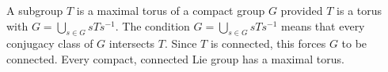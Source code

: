 A subgroup $T$ is a maximal torus of a compact group $G$ provided $T$ is a torus with $G = \bigcup_{s \in G} sTs^{-1}$. The condition $G = \bigcup_{s \in G} sTs^{-1}$ means that every conjugacy class of $G$ intersects $T$. Since $T$ is connected, this forces $G$ to be connected. Every compact, connected Lie group has a maximal torus.
